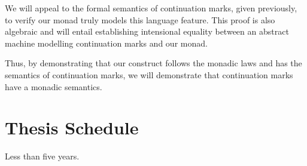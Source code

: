 \documentclass[ms]{byuprop}
\begin{document}
We will appeal to the formal semantics of continuation marks, given previously, to verify 
our monad truly models this language feature. This proof is also algebraic and will entail 
establishing intensional equality between an abstract machine modelling continuation marks 
and our monad.

Thus, by demonstrating that our construct follows the monadic laws and has the semantics
of continuation marks, we will demonstrate that continuation marks have a monadic semantics.







\section{Thesis Schedule}

Less than five years.





\end{document}
